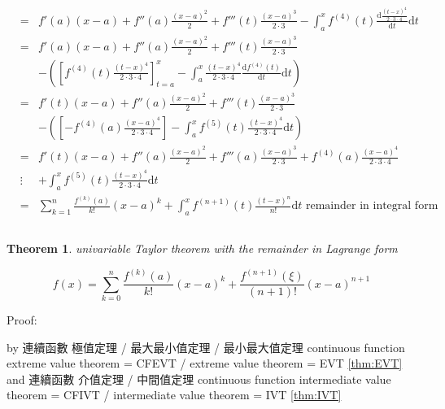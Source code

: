 \documentclass[
]{book}
\newtheorem{theorem}{Theorem}[chapter]
\theoremstyle{definition}
\theoremstyle{definition}
\theoremstyle{definition}
\theoremstyle{definition}
\theoremstyle{remark}
\begin{document}
\begin{eqnarray}
 & = & f'\left(a\right)\left(x-a\right)+f''\left(a\right)\frac{\left(x-a\right)^{2}}{2}+f'''\left(t\right)\frac{\left(x-a\right)^{3}}{2\cdot3}-\int_{a}^{x}f^{\left(4\right)}\left(t\right)\frac{\mathrm{d}\frac{\left(t-x\right)^{4}}{2\cdot3\cdot4}}{\mathrm{d}t}\mathrm{d}t\\
 & = & f'\left(a\right)\left(x-a\right)+f''\left(a\right)\frac{\left(x-a\right)^{2}}{2}+f'''\left(t\right)\frac{\left(x-a\right)^{3}}{2\cdot3}\\
 &  & -\left(\left[f^{\left(4\right)}\left(t\right)\frac{\left(t-x\right)^{4}}{2\cdot3\cdot4}\right]_{t=a}^{x}-\int_{a}^{x}\frac{\left(t-x\right)^{4}}{2\cdot3\cdot4}\frac{\mathrm{d}f^{\left(4\right)}\left(t\right)}{\mathrm{d}t}\mathrm{d}t\right)\\
 & = & f'\left(t\right)\left(x-a\right)+f''\left(a\right)\frac{\left(x-a\right)^{2}}{2}+f'''\left(t\right)\frac{\left(x-a\right)^{3}}{2\cdot3}\\
 &  & -\left(\left[-f^{\left(4\right)}\left(a\right)\frac{\left(x-a\right)^{4}}{2\cdot3\cdot4}\right]-\int_{a}^{x}f^{\left(5\right)}\left(t\right)\frac{\left(t-x\right)^{4}}{2\cdot3\cdot4}\mathrm{d}t\right)\\
 & = & f'\left(t\right)\left(x-a\right)+f''\left(a\right)\frac{\left(x-a\right)^{2}}{2}+f'''\left(a\right)\frac{\left(x-a\right)^{3}}{2\cdot3}+f^{\left(4\right)}\left(a\right)\frac{\left(x-a\right)^{4}}{2\cdot3\cdot4}\\
 & \vdots & +\int_{a}^{x}f^{\left(5\right)}\left(t\right)\frac{\left(t-x\right)^{4}}{2\cdot3\cdot4}\mathrm{d}t\\
 & = & \sum_{k=1}^{n}\frac{f^{\left(k\right)}\left(a\right)}{k!}\left(x-a\right)^{k}+\int_{a}^{x}f^{\left(n+1\right)}\left(t\right)\frac{\left(t-x\right)^{n}}{n!}\mathrm{d}t\textrm{ remainder in integral form}
\end{eqnarray}

\[
\tag*{$\Box$}
\]

\begin{theorem}
\protect\hypertarget{thm:unnamed-chunk-5}{}\label{thm:unnamed-chunk-5}univariable Taylor theorem with the remainder in Lagrange form
\end{theorem}

\[
f\left(x\right)=\sum_{k=0}^{n}\frac{f^{\left(k\right)}\left(a\right)}{k!}\left(x-a\right)^{k}+\frac{f^{\left(n+1\right)}\left(\xi\right)}{\left(n+1\right)!}\left(x-a\right)^{n+1}
\]

Proof:

\begin{CJK}{UTF8}{bsmi}
by 連續函數 極值定理 / 最大最小值定理 / 最小最大值定理 continuous function extreme value theorem = CFEVT / extreme value theorem = EVT \ref{thm:EVT} and 連續函數
介值定理 / 中間值定理 continuous function intermediate value theorem = CFIVT / intermediate value theorem = IVT \ref{thm:IVT}
\end{CJK}
\end{document}
